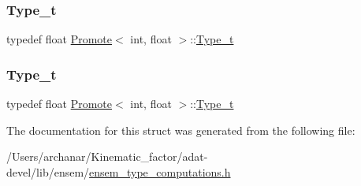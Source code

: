 \subsubsection{\texorpdfstring{Type\_t}{Type\_t}\hspace{0.1cm}{\footnotesize\ttfamily [2/3]}}
{\footnotesize\ttfamily typedef float \mbox{\hyperlink{structPromote}{Promote}}$<$ int, float $>$\+::\mbox{\hyperlink{structPromote_3_01int_00_01float_01_4_a368c812e2854d25d70464511b524bd9e}{Type\+\_\+t}}}

\mbox{\label{structPromote_3_01int_00_01float_01_4_a368c812e2854d25d70464511b524bd9e}} 
\subsubsection{\texorpdfstring{Type\_t}{Type\_t}\hspace{0.1cm}{\footnotesize\ttfamily [3/3]}}
{\footnotesize\ttfamily typedef float \mbox{\hyperlink{structPromote}{Promote}}$<$ int, float $>$\+::\mbox{\hyperlink{structPromote_3_01int_00_01float_01_4_a368c812e2854d25d70464511b524bd9e}{Type\+\_\+t}}}



The documentation for this struct was generated from the following file\+:\begin{DoxyCompactItemize}
\item 
/\+Users/archanar/\+Kinematic\+\_\+factor/adat-\/devel/lib/ensem/\mbox{\hyperlink{adat-devel_2lib_2ensem_2ensem__type__computations_8h}{ensem\+\_\+type\+\_\+computations.\+h}}\end{DoxyCompactItemize}
